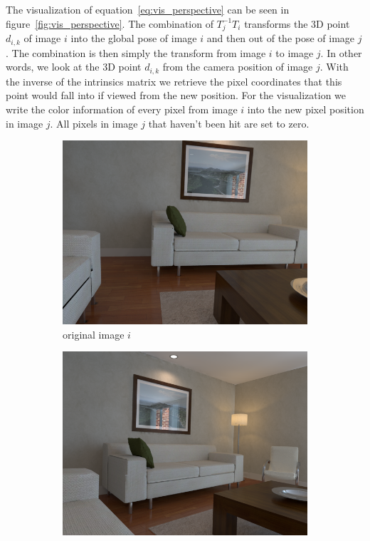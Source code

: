         The visualization of equation~\ref{eq:vis_perspective} can be seen in figure~\ref{fig:vis_perspective}.
        The combination of $T_j^{-1}T_i$ transforms the 3D point $d_{i,k}$ of image $i$ into the global pose of image $i$ and then out of the pose of image $j$.
        The combination is then simply the transform from image $i$ to image $j$.
        In other words, we look at the 3D point $d_{i,k}$ from the camera position of image $j$.
        With the inverse of the intrinsics matrix we retrieve the pixel coordinates that this point would fall into if viewed from the new position.
        For the visualization we write the color information of every pixel from image $i$ into the new pixel position in image $j$.
        All pixels in image $j$ that haven't been hit are set to zero.
        \begin{figure}[ht]
            \centering
            \begin{subfigure}[b]{.45\textwidth}
                \includegraphics[width=.95\textwidth]{images/vis_perspective_01}
                \caption{original image $i$}
                \label{sfig:i_original}
            \end{subfigure}
            \begin{subfigure}[b]{.45\textwidth}
                \includegraphics[width=.95\textwidth]{images/vis_perspective_03}

\end{subfigure}
\end{figure}
